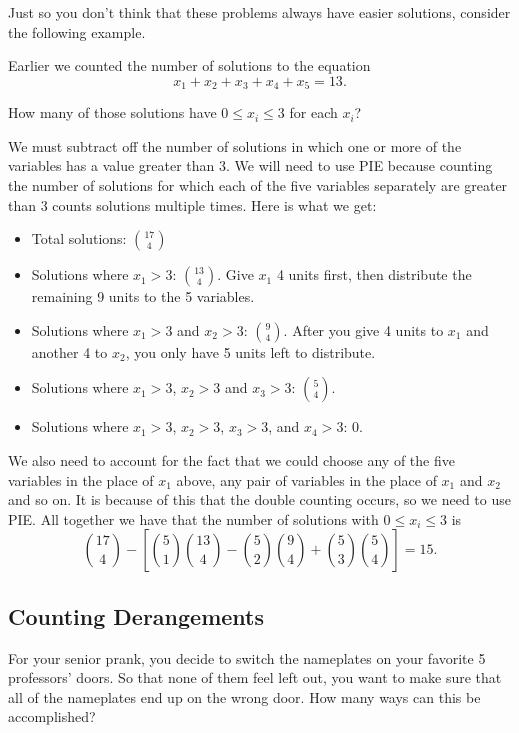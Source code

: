 \documentclass[12pt]{article}
\begin{document}
Just so you don't think that these problems always have easier solutions, consider the following example.

\begin{example}
Earlier we counted the number of solutions to the equation
\[x_1 + x_2 + x_3 + x_4 + x_5 = 13.\]

How many of those solutions have $0 \le x_i \le 3$ for each $x_i$? 


\begin{solution}
 We must subtract off the number of solutions in which one or more of the variables has a value greater than 3.  We will need to use PIE because counting the number of solutions for which each of the five variables separately are greater than 3 counts solutions multiple times.  Here is what we get:
    \begin{itemize}
      \item Total solutions: ${17 \choose 4}$
      \item Solutions where $x_1 > 3$: ${13 \choose 4}$.  Give $x_1$ 4 units first, then distribute the remaining 9 units to the 5 variables.
      \item Solutions where $x_1 > 3$ and $x_2 > 3$: ${9 \choose 4}$. After you give 4 units to $x_1$ and another 4 to $x_2$, you only have 5 units left to distribute.
      \item Solutions where $x_1 > 3$, $x_2 > 3$ and $x_3 > 3$: ${5 \choose 4}$.
      \item Solutions where $x_1 > 3$, $x_2 > 3$, $x_3 > 3$, and $x_4 > 3$: 0.
    \end{itemize}
    We also need to account for the fact that we could choose any of the five variables in the place of $x_1$ above, any pair of variables in the place of $x_1$ and $x_2$ and so on.  It is because of this that the double counting occurs, so we need to use PIE.  All together we have that the number of solutions with $0 \le x_i \le 3$ is
    \[{17 \choose 4} - \left[{5\choose 1}{13 \choose 4} - {5 \choose 2}{9 \choose 4} + {5 \choose 3}{5 \choose 4}\right] = 15.\]
  \end{solution}
\end{example}





\subsection{Counting Derangements}

\begin{activity}
For your senior prank, you decide to switch the nameplates on your favorite 5 professors' doors.  So that none of them feel left out, you want to make sure that all of the nameplates end up on the wrong door.  How many ways can this be accomplished?
\end{activity}
\end{document}

